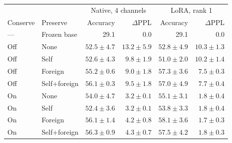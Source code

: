 \begin{tabular}{@{}llrrrr@{}}
\toprule
 & & \multicolumn{2}{c}{Native, 4 channels} & \multicolumn{2}{c}{LoRA, rank 1}\\
Conserve & Preserve & Accuracy & $\Delta$PPL & Accuracy & $\Delta$PPL\\
\midrule
--- & Frozen base & 29.1 & 0.0 & 29.1 & 0.0\\
Off & None & $52.5 \pm 4.7$ & $13.2 \pm 5.9$ & $52.8 \pm 4.9$ & $10.3 \pm 1.3$\\
Off & Self & $52.6 \pm 4.3$ & $9.8 \pm 1.9$ & $51.0 \pm 2.0$ & $10.2 \pm 1.4$\\
Off & Foreign & $55.2 \pm 0.6$ & $9.0 \pm 1.8$ & $57.3 \pm 3.6$ & $7.5 \pm 0.3$\\
Off & Self+foreign & $56.1 \pm 0.3$ & $9.5 \pm 1.8$ & $57.0 \pm 4.9$ & $7.7 \pm 0.4$\\
\midrule
On & None & $54.0 \pm 4.7$ & $3.2 \pm 0.1$ & $55.1 \pm 3.1$ & $1.8 \pm 0.4$\\
On & Self & $52.4 \pm 3.6$ & $3.2 \pm 0.1$ & $53.8 \pm 3.3$ & $1.8 \pm 0.4$\\
On & Foreign & $56.1 \pm 1.4$ & $4.2 \pm 0.8$ & $58.1 \pm 3.6$ & $1.7 \pm 0.3$\\
On & Self+foreign & $56.3 \pm 0.9$ & $4.3 \pm 0.7$ & $57.5 \pm 4.2$ & $1.8 \pm 0.3$\\
\bottomrule
\end{tabular}
